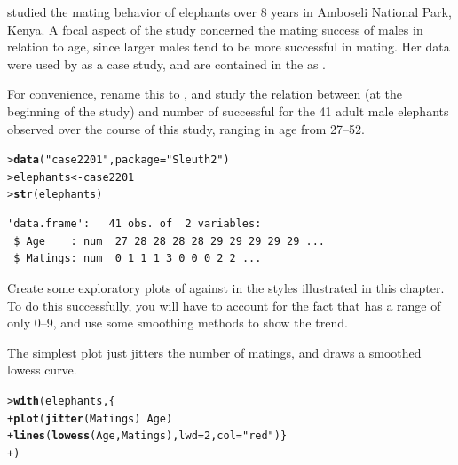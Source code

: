 \documentclass[10pt]{report}\usepackage[]{graphicx}\usepackage[]{color}
\makeatletter
\newcommand{\hlnum}[1]{\textcolor[rgb]{0.686,0.059,0.569}{#1}}%
\newcommand{\hlstr}[1]{\textcolor[rgb]{0.192,0.494,0.8}{#1}}%
\newcommand{\hlopt}[1]{\textcolor[rgb]{0,0,0}{#1}}%
\newcommand{\hlstd}[1]{\textcolor[rgb]{0.345,0.345,0.345}{#1}}%
\newcommand{\hlkwb}[1]{\textcolor[rgb]{0.69,0.353,0.396}{#1}}%
\newcommand{\hlkwc}[1]{\textcolor[rgb]{0.333,0.667,0.333}{#1}}%
\newcommand{\hlkwd}[1]{\textcolor[rgb]{0.737,0.353,0.396}{\textbf{#1}}}%
\newenvironment{kframe}{%
 \def\at@end@of@kframe{}%
 \ifinner\ifhmode%
  \def\at@end@of@kframe{\end{minipage}}%
  \begin{minipage}{\columnwidth}%
 \fi\fi%
 \def\FrameCommand##1{\hskip\@totalleftmargin \hskip-\fboxsep
 \colorbox{shadecolor}{##1}\hskip-\fboxsep
     \hskip-\linewidth \hskip-\@totalleftmargin \hskip\columnwidth}%
 \MakeFramed {\advance\hsize-\width
   \@totalleftmargin\z@ \linewidth\hsize
   \@setminipage}}%
 {\par\unskip\endMakeFramed%
 \at@end@of@kframe}
\newenvironment{knitrout}{}{} %
\renewenvironment{knitrout}{\small\renewcommand{\baselinestretch}{.85}}{} %
\makeatother
\begin{document}
\begin{Exercises}

  \exercise \citet{Poole:1989} studied the mating behavior of elephants over 8 years in Amboseli National Park,
  Kenya. A focal aspect of the study concerned the mating success of males in relation to age, since larger
  males tend to be more successful in mating.  Her data were used by \citet[]{RamseySchafer:2002} 
  as a case study, and are contained in the  \citep{Sleuth2} as .

  For convenience, rename this to , and study the relation between  
  (at the beginning of the study) and number of successful 
  for the 41 adult male elephants observed over the course of this study, ranging in age from 27--52.
\begin{knitrout}\footnotesize
{}\color{fgcolor}\begin{kframe}
\begin{alltt}
\hlstd{> }\hlkwd{data}\hlstd{(}\hlstr{"case2201"}\hlstd{,} \hlkwc{package}\hlstd{=}\hlstr{"Sleuth2"}\hlstd{)}
\hlstd{> }\hlstd{elephants} \hlkwb{<-} \hlstd{case2201}
\hlstd{> }\hlkwd{str}\hlstd{(elephants)}
\end{alltt}
\begin{verbatim}
'data.frame':	41 obs. of  2 variables:
 $ Age    : num  27 28 28 28 28 29 29 29 29 29 ...
 $ Matings: num  0 1 1 1 3 0 0 0 2 2 ...
\end{verbatim}
\end{kframe}
\end{knitrout}
  \begin{enumerate*}
    \item Create some exploratory plots of  against  in the styles illustrated in this chapter.
    To do this successfully, you will have to account for the fact that  has a range of only
    0--9, and use some smoothing methods to show the trend.
    \begin{ans}
    The simplest plot just jitters the number of matings, and draws a smoothed lowess curve.
\begin{knitrout}\footnotesize
{}\color{fgcolor}\begin{kframe}
\begin{alltt}
\hlstd{> }\hlkwd{with}\hlstd{(elephants, \{}
\hlstd{+ }        \hlkwd{plot}\hlstd{(}\hlkwd{jitter}\hlstd{(Matings)} \hlopt{~} \hlstd{Age)}
\hlstd{+ }        \hlkwd{lines}\hlstd{(}\hlkwd{lowess}\hlstd{(Age, Matings),} \hlkwc{lwd}\hlstd{=}\hlnum{2}\hlstd{,} \hlkwc{col}\hlstd{=}\hlstr{"red"}\hlstd{)\}}
\hlstd{+ }        \hlstd{)}
\end{alltt}
\end{kframe}


\end{knitrout}
\end{ans}
\end{enumerate*}
\end{Exercises}
\end{document}
